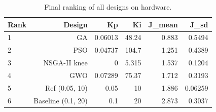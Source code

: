 \begin{table}[t]
\centering\caption{Final ranking of all designs on hardware.}\label{tab:hwrank}
\begin{tabular}{lrrrrr}
\toprule
Rank & Design & Kp & Ki & J\_mean & J\_sd \\
\midrule
1 & GA & 0.06013 & 48.24 & 0.883 & 0.5494 \\
2 & PSO & 0.04737 & 104.7 & 1.251 & 0.4389 \\
3 & NSGA-II knee & 0 & 5.315 & 1.537 & 0.1204 \\
4 & GWO & 0.07289 & 75.37 & 1.712 & 0.3193 \\
5 & Ref (0.05, 10) & 0.05 & 10 & 1.886 & 0.06259 \\
6 & Baseline (0.1, 20) & 0.1 & 20 & 2.873 & 0.3037 \\
\bottomrule
\end{tabular}
\end{table}
